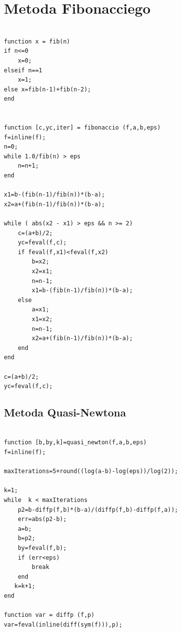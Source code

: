 \documentclass{classrep}
\begin{document}
\section{Metoda Fibonacciego}
\begin{lstlisting}

function x = fib(n)
if n<=0
    x=0;
elseif n==1
    x=1;
else x=fib(n-1)+fib(n-2);
end


function [c,yc,iter] = fibonaccio (f,a,b,eps)
f=inline(f);
n=0;
while 1.0/fib(n) > eps
    n=n+1;
end

x1=b-(fib(n-1)/fib(n))*(b-a);
x2=a+(fib(n-1)/fib(n))*(b-a);

while ( abs(x2 - x1) > eps && n >= 2)
    c=(a+b)/2;
    yc=feval(f,c);
    if feval(f,x1)<feval(f,x2)
        b=x2;
        x2=x1;
        n=n-1;
        x1=b-(fib(n-1)/fib(n))*(b-a);
    else
        a=x1;
        x1=x2;
        n=n-1;
        x2=a+(fib(n-1)/fib(n))*(b-a);
    end
end

c=(a+b)/2;
yc=feval(f,c);
\end{lstlisting}


\subsection{Metoda Quasi-Newtona}


\begin{lstlisting}

function [b,by,k]=quasi_newton(f,a,b,eps)
f=inline(f);

maxIterations=5+round((log(a-b)-log(eps))/log(2));

k=1;
while  k < maxIterations    
    p2=b-diffp(f,b)*(b-a)/(diffp(f,b)-diffp(f,a));    
    err=abs(p2-b);
    a=b;
    b=p2;
    by=feval(f,b);
    if (err<eps)
        break
    end
   k=k+1; 
end

function var = diffp (f,p)
var=feval(inline(diff(sym(f))),p);
\end{lstlisting}
\end{document}

